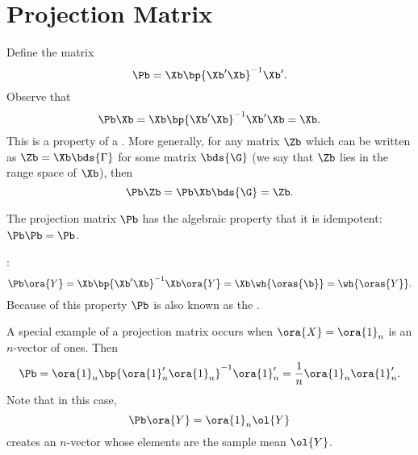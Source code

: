 \section{Projection Matrix}

Define the matrix 
\begin{equation}
    \label{hansen_eq_3_20}
    \Pb = \Xb \bp{\Xb^\prime \Xb}^{-1} \Xb^\prime.
\end{equation}
Observe that 
\begin{equation}
    \notag
    \Pb \Xb = \Xb \bp{\Xb^\prime \Xb}^{-1} \Xb^\prime  \Xb =  \Xb.
\end{equation}
This is a property of a . More generally, for any matrix $\Zb$ which can be written as $\Zb = \Xb \bds{\Gamma}$ for some matrix $\bds{\G}$ (we say that $\Zb$ lies in the range space of $\Xb$), then
\begin{equation}
    \notag
    \Pb \Zb = \Pb \Xb \bds{\G} = \Zb .
\end{equation}

The projection matrix $\Pb$ has the algebraic property that it is idempotent: $\Pb \Pb = \Pb$.

:
\begin{equation}
    \notag
    \Pb \ora{Y} = \Xb \bp{\Xb^{\prime} \Xb}^{-1} \Xb \ora{Y} = \Xb \wh{\oras{\b}} = \wh{\oras{Y}}.
\end{equation}
Because of this property $\Pb$ is also known as the .

A special example of a projection matrix occurs when $\ora{X} = \ora{1}_n$ is an $n$-vector of ones. Then 
\begin{equation}
    \notag
    \Pb = \ora{1}_n \bp{\ora{1}_n^\prime \ora{1}_n}^{-1}\ora{1}_n^\prime = \frac{1}{n} \ora{1}_n \ora{1}_n^\prime.
\end{equation}
Note that in this case,
\begin{equation}
    \notag
    \Pb \ora{Y} = \ora{1}_n\ol{Y}
\end{equation}
creates an $n$-vector whose elements are the sample mean $\ol{Y}$.

